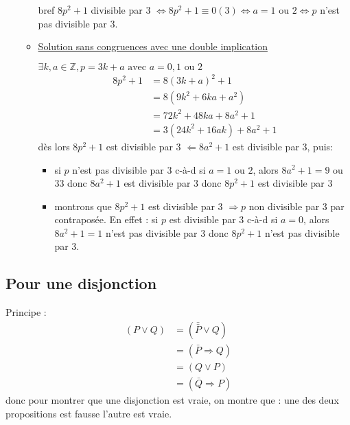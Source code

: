 \documentclass[12pt,a4paper,french]{book}
\begin{document}
\begin{itemize}
\begin{itemize}
		bref $8p^{2}+1$ divisible par 3 $\Leftrightarrow 8p^{2}+1 \equiv 0 (3) \Leftrightarrow a = 1$ ou $2 \Leftrightarrow p$ n'est pas divisible par 3.
		
		\item \underline{Solution sans congruences avec une double implication}
		
		$\exists k,a \in \mathbb{Z}, p = 3k+a \mbox{ avec } a=0,1 \mbox{ ou } 2$
		\begin{equation}
			\begin{split}
				8p^{2}+1 & = 8(3k+a)^{2}+1 \\ & = 8(9k^{2}+6ka + a^{2}) \\ & = 72k^{2}+48ka+8a^{2}+1 \\ & =3(24k^{2}+16ak) + 8a^{2}+1\end{split}
		\end{equation}
		dès lors $8p^{2}+1$ est divisible par 3 $\Leftarrow 8a^{2}+1$ est divisible par 3, puis: 
		\begin{itemize}
			\item \ovalbox{$\Leftarrow$} si $p$ n'est pas divisible par 3 c-à-d si $a=1$ ou $2$, alors $8a^{2}+1 = 9$ ou $33$ donc $8a^{2}+1$ est divisible par 3 donc $8p^{2}+1$ est divisible par 3
			\item \ovalbox{$\Rightarrow$} montrons que $8p^{2}+1$ est divisible par 3 $\Rightarrow p$ non divisible par 3 par contraposée. En effet : si $p$ est divisible par 3 c-à-d si $a=0$, alors $8a^{2}+1 = 1$ n'est pas divisible par 3 donc $8p^{2}+1$ n'est pas divisible par 3.
		\end{itemize}
	\end{itemize}	
\end{itemize}

\subsection{Pour une disjonction}

Principe :  
	\begin{equation}
		\begin{split}
			(P \vee Q) & = (\bar{\bar{P}} \vee Q) \\ & = (\bar{P} \Rightarrow Q) \\ & = (Q \vee P) \\ & = (\bar{Q} \Rightarrow P) \end{split}
	\end{equation}
	donc pour montrer que une disjonction est vraie, on montre que :  une des deux propositions est fausse  l'autre est vraie.
\end{document}
